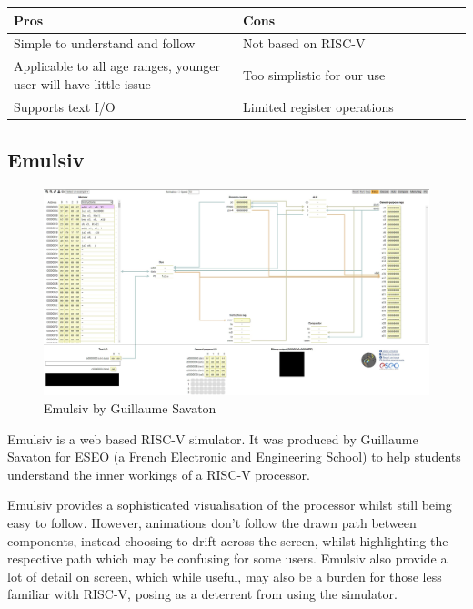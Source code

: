 \begin{table}[h]
\begin{tabular}{|p{0.5\linewidth} | p{0.5\linewidth}|}\hline
\textbf{Pros}                                                     & \textbf{Cons}                             \\\hline
Simple to understand and follow                                   & Not based on RISC-V                       \\\hline
Applicable to all age ranges, younger user will have little issue & Too simplistic for our use                \\\hline
Supports text I/O                                                 & Limited register operations \\\hline
\end{tabular}
\end{table}

\subsection{Emulsiv}\label{sec:emulsiv}
\begin{figure}[H]
    \centering
    \includegraphics[width=0.85\linewidth]{dissertation/DATA/EMULSIV.jpg}
    \caption{Emulsiv by Guillaume Savaton}
    \label{fig:emulsiv}
\end{figure}
Emulsiv \cite{savaton_2023_eseotechemulsiv} is a web based RISC-V simulator. It was produced by Guillaume Savaton for ESEO (a French Electronic and Engineering School) to help students understand the inner workings of a RISC-V processor. 

Emulsiv provides a sophisticated visualisation of the processor whilst still being easy to follow. However, animations don't follow the drawn path between components, instead choosing to drift across the screen, whilst highlighting the respective path which may be confusing for some users. Emulsiv also provide a lot of detail on screen, which while useful, may also be a burden for those less familiar with RISC-V, posing as a deterrent from using the simulator.

